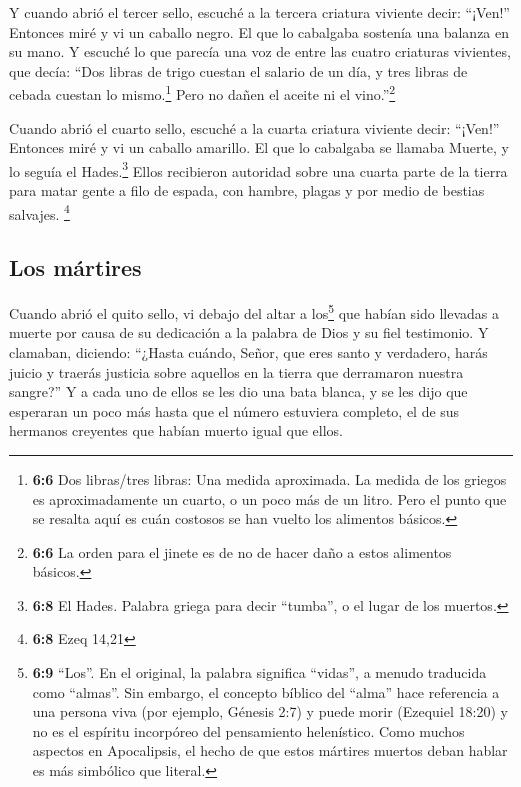 Y cuando abrió el tercer sello, escuché a la tercera
criatura viviente decir: ``¡Ven!'' Entonces miré y vi un caballo negro.
El que lo cabalgaba sostenía una balanza en su mano.  Y
escuché lo que parecía una voz de entre las cuatro criaturas vivientes,
que decía: ``Dos libras de trigo cuestan el salario de un día, y tres
libras de cebada cuestan lo mismo.\footnote{\textbf{6:6} Dos libras/tres
  libras: Una medida aproximada. La medida de los griegos es
  aproximadamente un cuarto, o un poco más de un litro. Pero el punto
  que se resalta aquí es cuán costosos se han vuelto los alimentos
  básicos.} Pero no dañen el aceite ni el vino.''\footnote{\textbf{6:6}
  La orden para el jinete es de no de hacer daño a estos alimentos
  básicos.}

 Cuando abrió el cuarto sello, escuché a la cuarta
criatura viviente decir: ``¡Ven!''  Entonces miré y vi un
caballo amarillo. El que lo cabalgaba se llamaba Muerte, y lo seguía el
Hades.\footnote{\textbf{6:8} El Hades. Palabra griega para decir
  ``tumba'', o el lugar de los muertos.} Ellos recibieron autoridad
sobre una cuarta parte de la tierra para matar gente a filo de espada,
con hambre, plagas y por medio de bestias salvajes. \footnote{\textbf{6:8}
  Ezeq 14,21}

\hypertarget{los-muxe1rtires}{%
\subsection{Los mártires}\label{los-muxe1rtires}}

 Cuando abrió el quito sello, vi debajo del altar a
los\footnote{\textbf{6:9} ``Los''. En el original, la palabra significa
  ``vidas'', a menudo traducida como ``almas''. Sin embargo, el concepto
  bíblico del ``alma'' hace referencia a una persona viva (por ejemplo,
  Génesis 2:7) y puede morir (Ezequiel 18:20) y no es el espíritu
  incorpóreo del pensamiento helenístico. Como muchos aspectos en
  Apocalipsis, el hecho de que estos mártires muertos deban hablar es
  más simbólico que literal.} que habían sido llevadas a muerte por
causa de su dedicación a la palabra de Dios y su fiel testimonio.
 Y clamaban, diciendo: ``¿Hasta cuándo, Señor, que eres
santo y verdadero, harás juicio y traerás justicia sobre aquellos en la
tierra que derramaron nuestra sangre?''  Y a cada uno de
ellos se les dio una bata blanca, y se les dijo que esperaran un poco
más hasta que el número estuviera completo, el de sus hermanos creyentes
que habían muerto igual que ellos.


